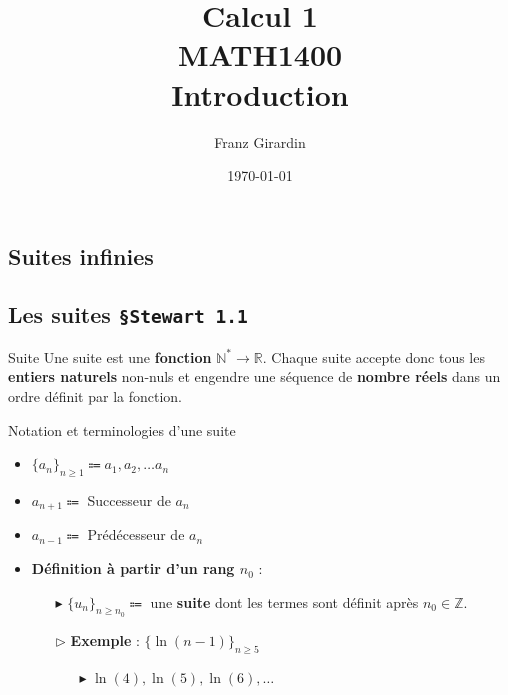 \documentclass[16pt]{report}
\title{\Huge{Calcul 1}\\{MATH1400}\\{\textbf{Introduction}}}
\author{\huge{Franz Girardin}}
\date{\today}
\begin{document}
\maketitle
\pagebreak
\tableofcontents 
\pagebreak

\pagebreak
\begin{multicols*}{2}


    \chapter{Suites infinies}

    \section{Les suites \quad \texttt{\S Stewart 1.1}  }
    \begin{Definitionx}{Suite}{}
        Une suite est une \textbf{fonction} $\mathbb{N}^* 
        \rightarrow \mathbb{R}$. 
        Chaque suite accepte donc tous les \textbf{entiers naturels} 
        non-nuls et engendre une séquence de \textbf{nombre réels} 
        dans un ordre définit par la fonction.
    \end{Definitionx}
    \begin{Syntaxe}{Notation et terminologies d'une suite}{}
        \begin{itemize}
            \item  $\{a_n\}_{n\geq1} \Coloneqq a_1, a_2, \dots a_n$  
            \item $a_{n+1} \Coloneqq$ Successeur de $a_n$ 
            \item $a_{n-1} \Coloneqq$ Prédécesseur de $a_n$
            \item \textbf{Définition à partir d'un rang $n_0$} : 
                \begin{itemize}
                    \item[$\blacktriangleright$] 
                        $\{u_n\}_{n\geq n_0} \Coloneqq$ une \textbf{suite} 
                        dont les termes sont définit après 
                        $n_0 \in \mathbb{Z}$.
                    \item[$\rhd$]  \textbf{Exemple} : 
                        $\{\ln(n-1) \}_{n\geq 5}$   
                        \begin{itemize}
                            \item[$\blacktriangleright$] 
                                $\ln(4), \ln(5), \ln(6), \dots$
                        \end{itemize}
                \end{itemize}
        \end{itemize}
    \end{Syntaxe}


\end{multicols*}
\end{document}
